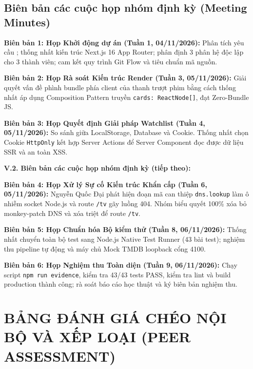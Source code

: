 \documentclass[12pt,a4paper]{extarticle}
\begin{document}
\subsection{Biên bản các cuộc họp nhóm định kỳ (Meeting Minutes)}

\textbf{Biên bản 1: Họp Khởi động dự án (Tuần 1, 04/11/2026):} Phân tích yêu cầu ; thống nhất kiến trúc Next.js 16 App Router; phân định 3 phân hệ độc lập cho 3 thành viên; cam kết quy trình Git Flow và tiêu chuẩn mã nguồn.

\textbf{Biên bản 2: Họp Rà soát Kiến trúc Render (Tuần 3, 05/11/2026):} Giải quyết vấn đề phình bundle phía client của thanh trượt phim bằng cách thống nhất áp dụng Composition Pattern truyền \texttt{cards: ReactNode[]}, đạt Zero-Bundle JS.

\textbf{Biên bản 3: Họp Quyết định Giải pháp Watchlist (Tuần 4, 05/11/2026):} So sánh giữa LocalStorage, Database và Cookie. Thống nhất chọn Cookie \texttt{HttpOnly} kết hợp Server Actions để Server Component đọc được dữ liệu SSR và an toàn XSS.

\newpage
\noindent \textbf{V.2. Biên bản các cuộc họp nhóm định kỳ (tiếp theo):}

\vspace{0.1cm}
\textbf{Biên bản 4: Họp Xử lý Sự cố Kiến trúc Khẩn cấp (Tuần 6, 05/11/2026):} Nguyễn Quốc Đại phát hiện đoạn mã can thiệp \texttt{dns.lookup} làm ô nhiễm socket Node.js và route \texttt{/tv} gãy luồng 404. Nhóm biểu quyết 100\% xóa bỏ monkey-patch DNS và xóa triệt để route \texttt{/tv}.

\textbf{Biên bản 5: Họp Chuẩn hóa Bộ kiểm thử (Tuần 8, 06/11/2026):} Thống nhất chuyển toàn bộ test sang Node.js Native Test Runner (43 bài test); nghiệm thu pipeline tự động  và máy chủ Mock TMDB loopback cổng 4100.

\textbf{Biên bản 6: Họp Nghiệm thu Toàn diện (Tuần 9, 06/11/2026):} Chạy script \texttt{npm run evidence}, kiểm tra 43/43 tests PASS, kiểm tra lint và build production thành công; rà soát báo cáo học thuật và ký biên bản nghiệm thu.

\section{BẢNG ĐÁNH GIÁ CHÉO NỘI BỘ VÀ XẾP LOẠI (PEER ASSESSMENT)}
\end{document}
